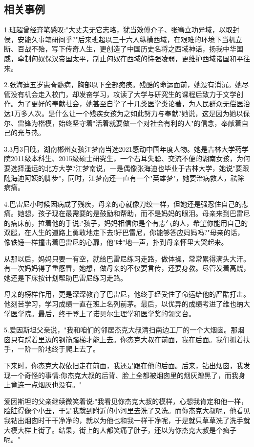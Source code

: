 \documentclass[UTF8]{ctexart}
\begin{document}
\subsection{相关事例}
1.班超曾经弃笔感叹:"大丈夫无它志略，犹当效傅介子、张骞立功异域，以取封侯，安能久事笔研间乎?"后来班超以三十六人纵横西域，在艰难的环境下当机立断、百战不殆，写下传奇人生，更创造了中国历史名将之西域神话，扬我中华国威，牵制匈奴保汉帝国太平，制止匈奴在西域的恃强凌弱，更维护西域诸国和平往来。\par
2.张海迪五岁患脊髓病，胸部以下全部瘫痪。残酷的命运面前，她没有消沉。她尽管没有机会走入校门，却发奋学习，攻读了大学与研究生的课程后致力于文学创作。为了更好的奉献社会，她甚至自学了十几类医学类论著，为人民群众无偿医治达1万多人次。是什么让一个残疾女孩为之如此努力与奉献?她说，这是因为她以保尔、雷锋为楷模，始终坚守着"活着就要做一个对社会有利的人"的信念，奉献着自己的光与热。\par
3.3月3日晚，湖南郴州女孩江梦南当选2021感动中国年度人物。她是吉林大学药学院2011级本科生、2015级硕士研究生，一个右耳失聪、交流不便的湖南女孩，为何要选择遥远的北方大学?江梦南说，一是偶像张海迪也毕业于吉林大学，她说"要跟随海迪阿姨的脚步"，同时，江梦南还一直有一个"英雄梦"，她要治病救人，祛除病痛。\par
4.巴雷尼小时候因病成了残疾，母亲的心就像刀绞一样，但她还是强忍住自己的悲痛。她想，孩子现在最需要的是鼓励和帮助，而不是妈妈的眼泪。母亲来到巴雷尼的病床前，拉着他的手说:"孩子，妈妈相信你是个有志气的人，希望你能用自己的双腿，在人生的道路上勇敢地走下去!好巴雷尼，你能够答应妈妈吗?"母亲的话，像铁锤一样撞击着巴雷尼的心扉，他"哇"地一声，扑到母亲怀里大哭起来。\par
从那以后，妈妈只要一有空，就给巴雷尼练习走路，做体操，常常累得满头大汗。有一次妈妈得了重感冒，她想，做母亲的不仅要言传，还要身教。尽管发着高烧，她还是下床按计划帮助巴雷尼练习走路。\par
母亲的榜样作用，更是深深教育了巴雷尼，他终于经受住了命运给他的严酷打击。他刻苦学习，学习成绩一直在班上名列前茅。最后，以优异的成绩考进了维也纳大学医学院。最后，终于登上了诺贝尔生理学和医学奖的领奖台。\par
5.爱因斯坦父亲说，"我和咱们的邻居杰克大叔清扫南边工厂的一个大烟囱。那烟囱只有踩着里边的钢筋踏梯才能上去。你杰克大叔在前面，我在后面。我们抓着扶手，一阶一阶地终于爬上去了。\par
下来时，你杰克大叔依旧走在前面，我还是跟在他的后面。后来，钻出烟囱，我发现一个奇怪的事情:你杰克大叔的后背、脸上全都被烟囱里的烟灰蹭黑了，而我身上竟连一点烟灰也没有。"\par
爱因斯坦的父亲继续微笑着说:"我看见你杰克大叔的模样，心想我肯定和他一样，脸脏得像个小丑，于是我就到附近的小河里去洗了又洗。而你杰克大叔呢，他看见我钻出烟囱时干干净净的，就以为他也和我一样干净呢，于是就只草草洗了洗手就大模大样上街了。结果，街上的人都笑痛了肚子，还以为你杰克大叔是个疯子呢。"\par
\end{document}
